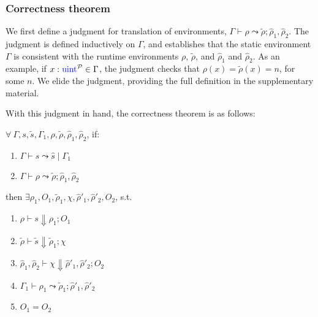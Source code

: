\subsubsection*{Correctness theorem} We first define a judgment for
translation of environments, $\Gamma \vdash \rho \leadsto
\widetilde{\rho}; \widehat{\rho}_{1}, \widehat{\rho}_{2}$. The
judgment is defined inductively on $\Gamma$, and establishes that
the static environment $\Gamma$ is consistent with the runtime
environments $\rho$, $\widetilde{\rho}$, and $\widehat{\rho}_{1}$ and
$\widehat{\rho}_{2}$. As an example, if $x:\kw{uint}^{\mathcal{P}} \in
\Gamma$, the judgment checks that $\rho(x) = \widetilde{\rho}(x) =
n$, for some $n$. We elide the judgment, providing the full definition
in the supplementary material.

With this judgment in hand, the correctness theorem is as follows:

\begin{theorem}[Correctness]\label{theorem:correctness}
  $\forall\:\Gamma, s, \widetilde{s}, \Gamma_{1}, \rho, \widetilde{\rho}, \widehat{\rho}_{1}, \widehat{\rho}_{2}$, if:

  \begin{enumerate}
  \item $\Gamma \vdash s \leadsto \widehat{s} \mid \Gamma_{1}$
  \item $\Gamma \vdash \rho \leadsto \widetilde{\rho}; \widehat{\rho}_{1}, \widehat{\rho}_{2}$
  \end{enumerate}

  then $\exists \rho_{1}, O_{1}, \widetilde{\rho}_{1}, \chi, \widehat{\rho}'_{1}, \widehat{\rho}'_{2}, O_{2}$, s.t.

  \begin{enumerate}[label=(\alph*)]
  \item $\rho \vdash s \Downarrow \rho_{1}; O_{1}$
  \item $\widetilde{\rho} \vdash \widetilde{s} \Downarrow \widetilde{\rho}_{1}; \chi$
  \item $\widehat{\rho}_{1}, \widehat{\rho}_{2} \vdash \chi \Downarrow \widehat{\rho}'_{1}, \widehat{\rho}'_{2}; O_{2}$
  \item $\Gamma_{1} \vdash \rho_{1} \leadsto \widetilde{\rho}_{1}; \widehat{\rho}'_{1}, \widehat{\rho}'_{2}$
  \item $O_{1} = O_{2}$
  \end{enumerate}
  
\end{theorem}

